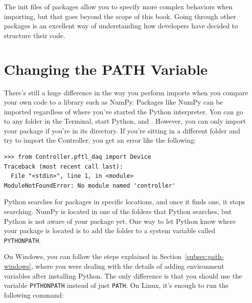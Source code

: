 
The init files of packages allow you to specify more complex behaviors when importing, but that goes beyond the scope of this book. Going through other packages is an excellent way of understanding how developers have decided to structure their code.

\section{Changing the PATH Variable}\label{sec:path}
There's still a huge difference in the way you perform imports when you compare your own code to a library such as NumPy. Packages like NumPy can be imported regardless of where you've started the Python interpreter. You can go to any folder in the Terminal, start Python, and . However, you can only import your package if you're in its directory. If you're sitting in a different folder and try to import the Controller, you get an error like the following:

\begin{verbatim}
>>> from Controller.pftl_daq import Device
Traceback (most recent call last):
  File "<stdin>", line 1, in <module>
ModuleNotFoundError: No module named 'controller'
\end{verbatim}

Python searches for packages in specific locations, and once it finds one, it stops searching. NumPy is located in one of the folders that Python searches, but Python is not aware of your package yet. One way to let Python know where your package is located is to add the folder to a system variable called \texttt{PYTHONPATH}.

On Windows, you can follow the steps explained in Section~\ref{subsec:path-windows}, where you were dealing with the details of adding environment variables after installing Python. The only difference is that you should use the variable \texttt{PYTHONPATH} instead of just \texttt{PATH}. On Linux, it's enough to run the following command:

